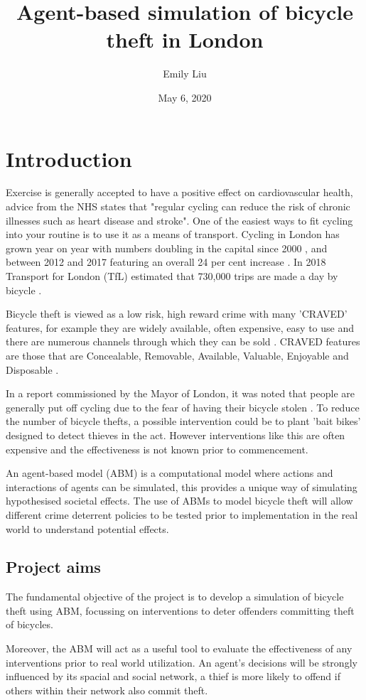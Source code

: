 \documentclass[11pt]{informatics-report}
\title{Agent-based simulation of bicycle theft in London}
\author{Emily Liu}
\date{May 6, 2020}
\begin{document}
\createFrontMatter
\tableofcontents

\chapter{Introduction}
Exercise is generally accepted to have a positive effect on cardiovascular health, advice from the NHS states that "regular cycling can reduce the risk of chronic illnesses such as heart disease and stroke"\cite{nhs}. One of the easiest ways to fit cycling into your routine is to use it as a means of transport. Cycling in London has grown year on year with numbers doubling in the capital since 2000 \cite{latransport}, and between 2012 and 2017 featuring an overall 24 per cent increase  \cite{actionplan}. In 2018 Transport for London (TfL) estimated that 730,000 trips are made a day by bicycle \cite{tfl}. \par
Bicycle theft is viewed as a low risk, high reward crime with many 'CRAVED' features, for example they are widely available, often expensive, easy to use and there are numerous channels through which they can be sold \cite{ucl}. CRAVED features are those that are Concealable, Removable, Available, Valuable, Enjoyable and Disposable \cite{craved}. \par

In a report commissioned by the Mayor of London, it was noted that people are generally put off cycling due to the fear of having their bicycle stolen \cite{actionplan}. To reduce the number of bicycle thefts, a possible intervention could be to plant 'bait bikes' designed to detect thieves in the act. However interventions like this are often expensive and the effectiveness is not known prior to commencement. \par

An agent-based model (ABM) is a computational model where actions and interactions of agents can be simulated, this provides a unique way of simulating hypothesised societal effects. The use of ABMs to model bicycle theft will allow different crime deterrent policies to be tested prior to implementation in the real world to understand potential effects.

\section{Project aims}
The fundamental objective of the project is to develop a simulation of bicycle theft using ABM, focussing on interventions to deter offenders committing theft of bicycles. \par
Moreover, the ABM will act as a useful tool to evaluate the effectiveness of any interventions prior to real world utilization. An agent's decisions will be strongly influenced by its spacial and social network, a thief is more likely to offend if others within their network also commit theft. 
\end{document}
